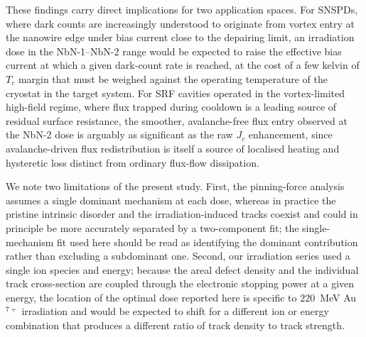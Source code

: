 These findings carry direct implications for two application spaces. For SNSPDs, where dark counts are increasingly understood to originate from vortex entry at the nanowire edge under bias current close to the depairing limit, an irradiation dose in the NbN-1--NbN-2 range would be expected to raise the effective bias current at which a given dark-count rate is reached, at the cost of a few kelvin of $T_c$ margin that must be weighed against the operating temperature of the cryostat in the target system. For SRF cavities operated in the vortex-limited high-field regime, where flux trapped during cooldown is a leading source of residual surface resistance, the smoother, avalanche-free flux entry observed at the NbN-2 dose is arguably as significant as the raw $J_c$ enhancement, since avalanche-driven flux redistribution is itself a source of localised heating and hysteretic loss distinct from ordinary flux-flow dissipation.

We note two limitations of the present study. First, the pinning-force analysis assumes a single dominant mechanism at each dose, whereas in practice the pristine intrinsic disorder and the irradiation-induced tracks coexist and could in principle be more accurately separated by a two-component fit; the single-mechanism fit used here should be read as identifying the dominant contribution rather than excluding a subdominant one. Second, our irradiation series used a single ion species and energy; because the areal defect density and the individual track cross-section are coupled through the electronic stopping power at a given energy, the location of the optimal dose reported here is specific to $220$~MeV Au$^{7+}$ irradiation and would be expected to shift for a different ion or energy combination that produces a different ratio of track density to track strength.
